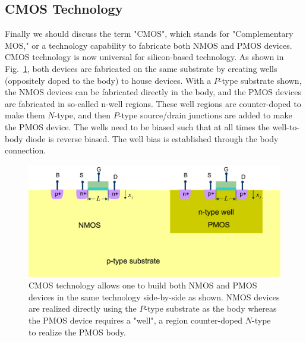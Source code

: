 \subsection{CMOS Technology}
Finally we should discuss the term "CMOS", which stands for "Complementary MOS," or a technology capability to fabricate both NMOS and PMOS devices.  CMOS technology is now universal for silicon-based technology.  As shown in Fig.~\ref{fig:cmos_xsect}, both devices are fabricated on the same substrate by creating wells (oppositely doped to the body) to house devices.  With a $P$-type substrate shown, the NMOS devices can be fabricated directly in the body, and the PMOS devices are fabricated in so-called n-well regions.  These well regions are counter-doped to make them $N$-type, and then $P$-type source/drain junctions are added to make the PMOS device.  The wells need to be biased such that at all times the well-to-body diode is reverse biased.  The well bias is established through the body connection.
\begin{figure}[tb]
\centering
\includegraphics[width=.85\columnwidth]{cmos_xsect}
\caption{CMOS technology allows one to build both NMOS and PMOS devices in the same technology side-by-side as shown.  NMOS devices are realized directly using the $P$-type substrate as the body whereas the PMOS device requires a "well", a region counter-doped $N$-type to realize the PMOS body.}
\label{fig:cmos_xsect}
\end{figure}
